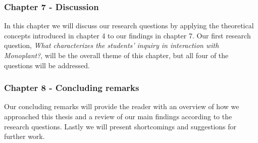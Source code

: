 \subsubsection*{Chapter 7 - Discussion}
In this chapter we will discuss our research questions by applying the theoretical concepts introduced in chapter 4 to our findings in chapter 7. Our first research question, \emph{What characterizes the students’ inquiry in interaction with Monoplant?}, will be the overall theme of this chapter, but all four of the questions will be addressed.

\subsubsection*{Chapter 8 - Concluding remarks}
Our concluding remarks will provide the reader with an overview of how we approached this thesis and a review of our main findings according to the research questions. Lastly we will present shortcomings and suggestions for further work.